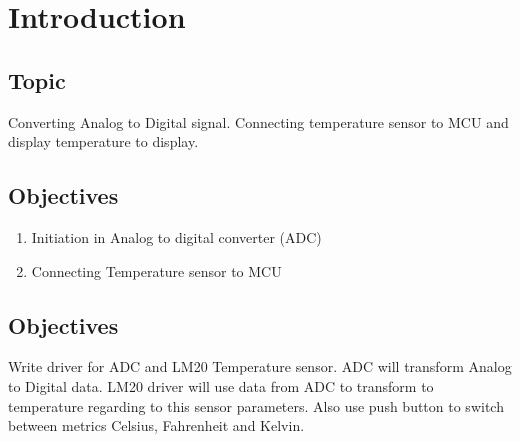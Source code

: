 \section*{\center Introduction}


\subsection*{Topic}
Converting Analog to Digital signal. Connecting temperature sensor to MCU and display temperature to display.


\subsection*{Objectives}
\begin{enumerate}
	\item Initiation in Analog to digital converter (ADC)
    \item Connecting Temperature sensor to MCU
\end{enumerate}


\subsection*{Objectives}
Write driver for ADC and LM20 Temperature sensor. ADC will transform Analog to Digital data. LM20 driver will use data from ADC to transform to temperature regarding to this sensor parameters. Also use push button to switch between metrics Celsius, Fahrenheit and Kelvin.


